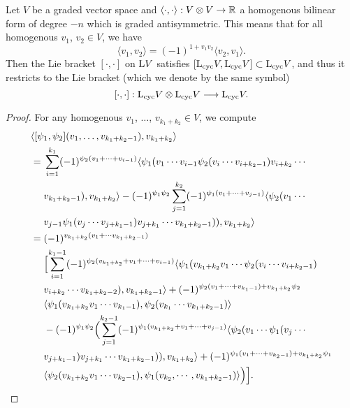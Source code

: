 \documentclass[\MainFolder/Text.tex]{subfiles}
\begin{document}
\begin{Lemma}
Let $V$ be a graded vector space and $\langle \cdot,\cdot\rangle: V\otimes V \rightarrow \mathbb{R}$ a homogenous bilinear form of degree $-n$ which is graded antisymmetric. This means that for all homogenous $v_1$, $v_2\in V$, we have
\[ \langle v_1, v_2 \rangle = (-1)^{1+v_1 v_2}\langle v_2, v_1\rangle. \]
Then the Lie bracket $[\cdot,\cdot]$ on $\mathrm{L} V$ satisfies $[\mathrm{L}_{\mathrm{cyc}} V, \mathrm{L}_{\mathrm{cyc}} V]\subset\mathrm{L}_{\mathrm{cyc}} V$, and thus it restricts to the Lie bracket (which we denote by the same symbol) 
\[ [\cdot,\cdot]: \mathrm{L}_{\mathrm{cyc}} V \otimes \mathrm{L}_{\mathrm{cyc}} V \longrightarrow \mathrm{L}_{\mathrm{cyc}} V. \]
\end{Lemma}
\begin{proof}
For any homogenous $v_1$, $\dotsc$, $v_{k_1+k_2} \in V$, we compute
\begin{align*}
&\langle[\psi_1,\psi_2](v_1,\dotsc,v_{k_1+k_2-1}),v_{k_1+k_2}\rangle \\
& = \begin{aligned}[t]
&\sum_{i=1}^{k_1} (-1)^{\psi_2(v_1+\dotsb+v_{i-1})}\langle \psi_1(v_1 \dotsb v_{i-1}\psi_2(v_i \dotsb v_{i+k_2-1}) v_{i+k_2}\dotsb \\ &v_{k_1+k_2-1}), v_{k_1+k_2}\rangle - (-1)^{\psi_1 \psi_2}\sum_{j=1}^{k_2}(-1)^{\psi_1(v_1+\dotsb+v_{j-1})}\langle \psi_2(v_1\dotsb \\
&v_{j-1}\psi_1(v_j\dotsb v_{j+k_1-1})v_{j+k_1}\dotsb v_{k_1+k_2-1})), v_{k_1+k_2}\rangle\end{aligned}\\
& = \begin{aligned}[t]
& (-1)^{v_{k_1+k_2}(v_1 + \dotsb v_{k_1+k_2-1})} \\
& \Bigl[\sum_{i=1}^{k_1-1} (-1)^{\psi_2(v_{k_1+k_2}+v_1+\dotsb+v_{i-1})} \langle \psi_1(v_{k_1+k_2} v_1 \dotsb \psi_2(v_i \dotsb v_{i+k_2-1})\\
& v_{i+k_2}\dotsb v_{k_1+k_2-2}), v_{k_1+k_2-1}\rangle+(-1)^{\psi_2(v_1+\dotsb+v_{k_1-1})+v_{k_1+k_2}\psi_2}\\
&\langle \psi_1(v_{k_1+k_2} v_1\dotsb v_{k_1-1}),\psi_2(v_{k_1}\dotsb v_{k_1+k_2-1})\rangle\\
&- (-1)^{\psi_1 \psi_2}\Bigl(\sum_{j=1}^{k_2-1}(-1)^{\psi_1(v_{k_1+k_2}+v_1+\dotsb+v_{j-1})}\langle \psi_2(v_1\dotsb\psi_1(v_j\dotsb\\
& v_{j+k_1-1})v_{j+k_1}\dotsb v_{k_1+k_2-1})), v_{k_1+k_2}\rangle + (-1)^{\psi_1(v_1+\dotsb+v_{k_2-1})+v_{k_1+k_2}\psi_1} \\
& \langle \psi_2(v_{k_1+k_2} v_1\dotsb v_{k_2-1}),\psi_1(v_{k_2},\dotsb,v_{k_1+k_2-1})\rangle\Bigr)\Bigr].

\end{aligned}
\end{align*}
\end{proof}
\end{document}
